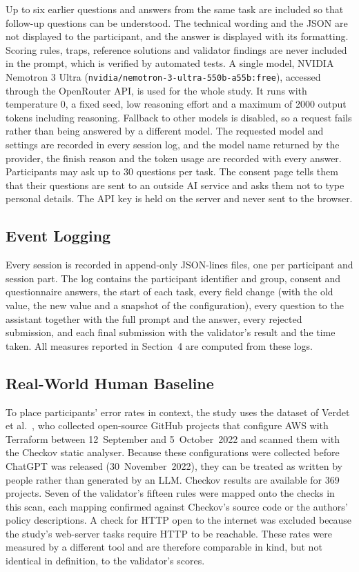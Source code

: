 Up to six earlier questions and answers from the same task are included so that follow-up questions can be understood. The technical wording and the JSON are not displayed to the participant, and the answer is displayed with its formatting. Scoring rules, traps, reference solutions and validator findings are never included in the prompt, which is verified by automated tests. A single model, NVIDIA Nemotron 3 Ultra (\texttt{nvidia/nemotron-3-ultra-550b-a55b:free}), accessed through the OpenRouter API, is used for the whole study. It runs with temperature 0, a fixed seed, low reasoning effort and a maximum of 2000 output tokens including reasoning. Fallback to other models is disabled, so a request fails rather than being answered by a different model. The requested model and settings are recorded in every session log, and the model name returned by the provider, the finish reason and the token usage are recorded with every answer. Participants may ask up to 30 questions per task. The consent page tells them that their questions are sent to an outside AI service and asks them not to type personal details. The API key is held on the server and never sent to the browser.

\subsection{Event Logging}

Every session is recorded in append-only JSON-lines files, one per participant and session part. The log contains the participant identifier and group, consent and questionnaire answers, the start of each task, every field change (with the old value, the new value and a snapshot of the configuration), every question to the assistant together with the full prompt and the answer, every rejected submission, and each final submission with the validator's result and the time taken. All measures reported in Section~4 are computed from these logs.

\subsection{Real-World Human Baseline}

To place participants' error rates in context, the study uses the dataset of Verdet et al.\ \cite{verdet2025}, who collected open-source GitHub projects that configure AWS with Terraform between 12~September and 5~October~2022 and scanned them with the Checkov static analyser. Because these configurations were collected before ChatGPT was released (30~November~2022), they can be treated as written by people rather than generated by an LLM. Checkov results are available for 369 projects. Seven of the validator's fifteen rules were mapped onto the checks in this scan, each mapping confirmed against Checkov's source code or the authors' policy descriptions. A check for HTTP open to the internet was excluded because the study's web-server tasks require HTTP to be reachable. These rates were measured by a different tool and are therefore comparable in kind, but not identical in definition, to the validator's scores.

